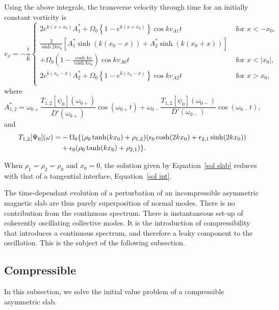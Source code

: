 \documentclass[12pt]{../style-files/ociamthesis}
\begin{document}
Using the above integrals, the transverse velocity through time for an initially constant vorticity is
\begin{equation}
v_x = -\frac{i}{k}\begin{cases}
2 e^{k(x+x_0)} A^*_1 + \Omega_0 \left\{1 - e^{k(x+x_0)}\right\} \cos{kv_{A1}t} \quad &\text{ for } x<-x_0, \\
\frac{2}{\sinh{2kx_0}} \left[ A^*_1 \sinh(k(x_0 - x)) + A^*_2 \sinh(k(x_0 + x)) \right] & \\
+ \Omega_0 \left( 1 - \frac{\cosh{kx}}{\cosh{kx_0}} \right)\cos{kv_{A0}t} \quad &\text{ for } x < |x_0|, \\
2 e^{k(x_0-x)} A^*_2 + \Omega_0 \left\{1 - e^{k(x_0-x)}\right\} \cos{kv_{A2}t} \quad &\text{ for } x>x_0, \\
\end{cases}
\label{sol slab}
\end{equation}
where
\begin{equation}
A^*_{1,2} = \omega_{0+} \frac{T_{1,2}[\psi_0](\omega_{0+})}{D'(\omega_{0+})} \cos(\omega_{0+} t) + \omega_{0-}\frac{T_{1,2}[\psi_0](\omega_{0-})}{D'(\omega_{0-})} \cos(\omega_{0-} t),
\end{equation}
and
\begin{align}
T_{1,2}[\Psi_0](\omega) = &-\Omega_0\{ (\rho_0 \tanh(kx_0) + \rho_{1,2}) (\epsilon_0 \cosh(2kx_0) + \epsilon_{2,1}\sinh(2kx_0)) \notag \\
&+ \epsilon_0(\rho_0 \tanh(kx_0) + \rho_{2,1}) \}.
\end{align}

When $\rho_1 = \rho_2 = \rho_0$ and $x_0 = 0$, the solution given by Equation~\eqref{sol slab} reduces with that of a tangential interface, Equation~\eqref{sol int}.

The time-dependant evolution of a perturbation of an incompressible asymmetric magnetic slab are thus purely superposition of normal modes. There is no contribution from the continuous spectrum. There is instantaneous set-up of coherently oscillating collective modes. It is the introduction of compressibility that introduces a continuous spectrum, and therefore a leaky component to the oscillation. This is the subject of the following subsection.


\subsection{Compressible}

In this subsection, we solve the initial value problem of a compressible asymmetric slab. 
\end{document}
